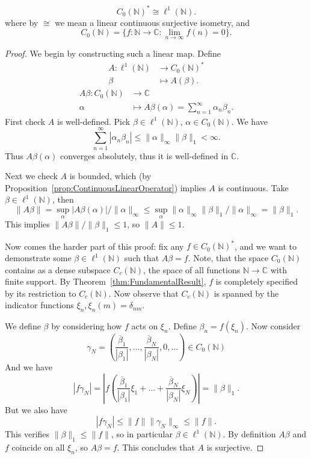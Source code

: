 
\begin{proposition}
	\label{prop:IsometryC0dualL1}
	\[
		C_0(\mathbb{N})^* \cong \ell^1(\mathbb{N})
	.\] 
	where by $\cong$ we mean a linear continuous surjective isometry, and
\[
	C_0(\mathbb{N}) = \{f: \mathbb{N} \to \mathbb{C}: \lim _{n \to \infty } f(n) = 0\} 
.\] 
\end{proposition}
\begin{proof}
	We begin by constructing such a linear map. Define
\begin{align*}
	A: \ell^1(\mathbb{N}) &\longrightarrow C_0(\mathbb{N})^* \\
	\beta &\longmapsto A(\beta) 
.\end{align*}
\begin{align*}
	A\beta: C_0(\mathbb{N}) &\longrightarrow \mathbb{C} \\
	\alpha &\longmapsto A\beta(\alpha) 
	= \sum_{n = 1}^\infty \alpha_n \beta_n
.\end{align*}
First check $A$ is well-defined. Pick $\beta \in \ell^1(\mathbb{N})$, $\alpha \in C_0(\mathbb{N})$. We have
\[
	 \sum_{n = 1}^\infty |\alpha_n \beta_n |
	 \le \|\alpha\|_\infty \|\beta\|_1 < \infty 
.\] 
Thus $A \beta(\alpha)$ converges absolutely, thus it is well-defined in $\mathbb{C}$.

Next we check $A$ is bounded, which (by Proposition~\ref{prop:ContinuousLinearOperator}) implies $A$ is continuous. Take $\beta \in \ell^1(\mathbb{N})$, then
\[
	\| A \beta\| = \sup _\alpha \left| A \beta (\alpha) \right| / \|\alpha\|_\infty 
	\le \sup _\alpha \|\alpha\|_\infty \|\beta\|_1 / \|\alpha\|_\infty 
	= \|\beta\|_1
.\] 
This implies $\|A \beta\|/ \|\beta\|_1 \le 1$, so $\|A\| \le 1$.

Now comes the harder part of this proof: fix any $f \in C_0(\mathbb{N})^*$, and we want to demonstrate some $\beta \in \ell^1(\mathbb{N})$ such that $A \beta = f$. Note, that the space $C_0(\mathbb{N})$ contains as a dense subspace $C_c(\mathbb{N})$, the space of all functions $\mathbb{N} \to \mathbb{C}$ with finite support. By Theorem~\ref{thm:FundamentalResult}, $f$ is completely specified by its restriction to $C_c(\mathbb{N})$. Now observe that $C_c(\mathbb{N})$ is spanned by the indicator functions $\xi_n, \xi_n(m) = \delta_{n m}$. 

We define $\beta$ by considering how $f$ acts on $\xi_n$. Define $\beta_n = f(\xi_n)$. Now consider
	\[
		\gamma_N = \left( \frac{\overline{\beta} _1}{|\beta _1|}, \ldots, \frac{\overline{\beta} _N}{|\beta_N|},0,\ldots \right) \in C_0(\mathbb{N})
	\]
	And we have
	\[
		|f\gamma_N| = 
		\left| f\left(  \frac{\overline{\beta} _1}{|\beta _1|} \xi_1 +  \ldots+ \frac{\overline{\beta} _N}{|\beta_N|}\xi_N \right)  \right| 
		= \|\beta\|_1
	.\] 
	But we also have
	\[
		\left| f \gamma_N \right|  \le \|f\| \|\gamma_N\|_{\infty } \le \|f\|
	.\] 
	This verifies $\|\beta\|_1 \le \|f\|$, so in particular  $\beta \in \ell^1(\mathbb{N})$.
	By definition $A \beta$ and $f$ coincide on all $\xi_n$, so $A \beta = f$. This concludes that $A$ is surjective.


\end{proof}
